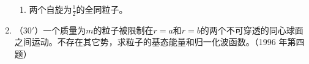 \begin{enumerate}
\begin{enumerate}
\item 
两个自旋为$\frac{1}{2}$的全同粒子。

\end{enumerate}


\banswer{
	
}



\item 
（$30'$）一个质量为$m$的粒子被限制在$r=a$和$r=b$的两个不可穿透的同心球面之间运动。不存在其它势，求粒子的基态能量和归一化波函数。（1996 年第四题） 

\banswer{
	
}



\end{enumerate}


